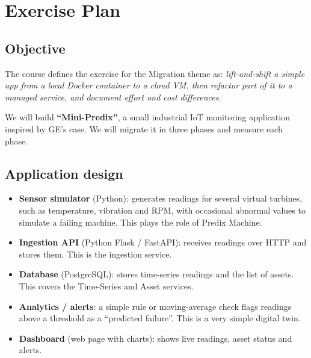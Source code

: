 \documentclass[12pt,a4paper]{article}
\begin{document}
\section{Exercise Plan}
\subsection{Objective}
The course defines the exercise for the Migration theme as: \emph{lift-and-shift a simple app from a local Docker
container to a cloud VM, then refactor part of it to a managed service, and document effort and cost differences}.

We will build \textbf{``Mini-Predix''}, a small industrial IoT monitoring application inspired by GE's case. We will
migrate it in three phases and measure each phase.

\subsection{Application design}
\begin{itemize}
  \item \textbf{Sensor simulator} (Python): generates readings for several virtual turbines, such as temperature,
        vibration and RPM, with occasional abnormal values to simulate a failing machine. This plays the role of Predix Machine.
  \item \textbf{Ingestion API} (Python Flask / FastAPI): receives readings over HTTP and stores them. This is the ingestion service.
  \item \textbf{Database} (PostgreSQL): stores time-series readings and the list of assets. This covers the Time-Series and Asset services.
  \item \textbf{Analytics / alerts}: a simple rule or moving-average check flags readings above a threshold as a
        ``predicted failure''. This is a very simple digital twin.
  \item \textbf{Dashboard} (web page with charts): shows live readings, asset status and alerts.
\end{itemize}
\end{document}
